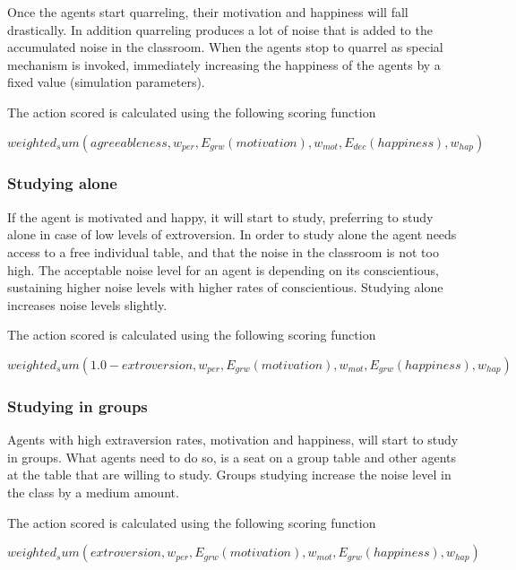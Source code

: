 Once the agents start quarreling, their motivation and happiness will fall drastically.
In addition quarreling produces a lot of noise that is added to the accumulated
noise in the classroom.
When the agents stop to quarrel as special mechanism is invoked, immediately
increasing the happiness of the agents by a fixed value (simulation parameters).

The action scored is calculated using the following scoring function

\begin{equation}
    weighted_sum(agreeableness, w_{per}, E_{grw}(motivation), w_{mot}, E_{dec}(happiness), w_{hap})
\end{equation}


\subsubsection{Studying alone}
If the agent is motivated and happy, it will start to study, preferring
to study alone in case of low levels of extroversion. In order to study alone the
agent needs access to a free individual table, and that the noise in the classroom
is not too high. The acceptable noise level for an agent is depending on its
conscientious, sustaining higher noise levels with higher rates of conscientious.
Studying alone increases noise levels slightly.

The action scored is calculated using the following scoring function

\begin{equation}
    weighted_sum(1.0 - extroversion, w_{per}, E_{grw}(motivation), w_{mot}, E_{grw}(happiness), w_{hap})
\end{equation}

\subsubsection{Studying in groups}
Agents with high extraversion rates, motivation and happiness, will start to study
in groups. What agents need to do so, is a seat on a group table and other agents
at the table that are willing to study. Groups studying increase the noise level
in the class by a medium amount.

The action scored is calculated using the following scoring function

\begin{equation}
    weighted_sum(extroversion, w_{per}, E_{grw}(motivation), w_{mot}, E_{grw}(happiness), w_{hap})
\end{equation}
